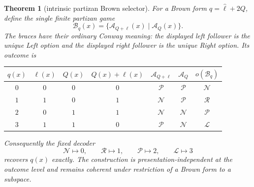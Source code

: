 \documentclass[11pt]{article}
\newtheorem{theorem}{Theorem}
\theoremstyle{definition}
\theoremstyle{remark}
\begin{document}
\begin{theorem}[intrinsic partizan Brown selector]
\label{thm:partizan-selector}
For a Brown form $q=\widehat\ell+2Q$, define the single finite partizan game
\begin{equation}\label{eq:partizan-selector}
 \mathcal B_q(x)
 =\bigl\{\mathcal A_{Q+\ell}(x)
       \mathbin\vert \mathcal A_Q(x)\bigr\}.
\end{equation}
The braces have their ordinary Conway meaning: the displayed left follower is
the unique Left option and the displayed right follower is the unique Right
option.  Its outcome is
\begin{center}
\begin{tabular}{ccccccc}
\toprule
$q(x)$ & $\ell(x)$ & $Q(x)$ & $Q(x)+\ell(x)$
 & $\mathcal A_{Q+\ell}$ & $\mathcal A_Q$ & $o(\mathcal B_q)$\\
\midrule
$0$ & $0$ & $0$ & $0$ & $\mathcal P$ & $\mathcal P$ & $\mathcal N$\\
$1$ & $1$ & $0$ & $1$ & $\mathcal N$ & $\mathcal P$ & $\mathcal R$\\
$2$ & $0$ & $1$ & $1$ & $\mathcal N$ & $\mathcal N$ & $\mathcal P$\\
$3$ & $1$ & $1$ & $0$ & $\mathcal P$ & $\mathcal N$ & $\mathcal L$\\
\bottomrule
\end{tabular}
\end{center}
Consequently the fixed decoder
\begin{equation}\label{eq:outcome-decoder}
 \mathcal N\mapsto0,\qquad
 \mathcal R\mapsto1,\qquad
 \mathcal P\mapsto2,\qquad
 \mathcal L\mapsto3
\end{equation}
recovers $q(x)$ exactly.  The construction is presentation-independent at the
outcome level and remains coherent under restriction of a Brown form to a
subspace.
\end{theorem}
\end{document}
